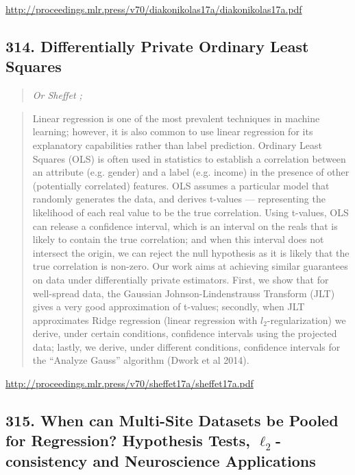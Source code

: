 \documentclass{article}
\begin{document}
\href{http://proceedings.mlr.press/v70/diakonikolas17a/diakonikolas17a.pdf}{http://proceedings.mlr.press/v70/diakonikolas17a/diakonikolas17a.pdf}

\subsection{314. Differentially Private Ordinary Least Squares}

\begin{quote}
\footnotesize{\textit{Or Sheffet ;}}
\end{quote}

\begin{quote}
    Linear regression is one of the most prevalent techniques in machine learning; however, it is also common to use linear regression for its explanatory capabilities rather than label prediction. Ordinary Least Squares (OLS) is often used in statistics to establish a correlation between an attribute (e.g. gender) and a label (e.g. income) in the presence of other (potentially correlated) features. OLS assumes a particular model that randomly generates the data, and derives t-values — representing the likelihood of each real value to be the true correlation. Using t-values, OLS can release a confidence interval, which is an interval on the reals that is likely to contain the true correlation; and when this interval does not intersect the origin, we can reject the null hypothesis as it is likely that the true correlation is non-zero. Our work aims at achieving similar guarantees on data under differentially private estimators. First, we show that for well-spread data, the Gaussian Johnson-Lindenstrauss Transform (JLT) gives a very good approximation of t-values; secondly, when JLT approximates Ridge regression (linear regression with $l_2$-regularization) we derive, under certain conditions, confidence intervals using the projected data; lastly, we derive, under different conditions, confidence intervals for the “Analyze Gauss” algorithm (Dwork et al 2014).  \end{quote}

\href{http://proceedings.mlr.press/v70/sheffet17a/sheffet17a.pdf}{http://proceedings.mlr.press/v70/sheffet17a/sheffet17a.pdf}

\subsection{315. When can Multi-Site Datasets be Pooled for Regression? Hypothesis Tests, $\ell_2$-consistency and Neuroscience Applications}
\end{document}
